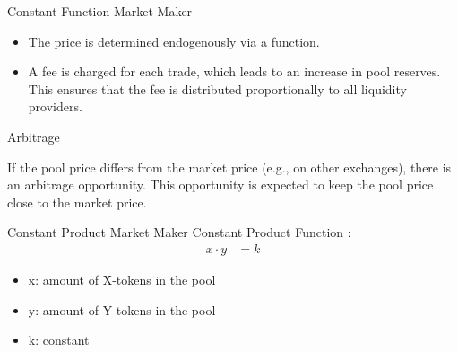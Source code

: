 \documentclass[]{beamer}
\begin{document}
\begin{frame}{Constant Function Market Maker}

	\begin{figure}	
		\centering
		
	\end{figure}

	\begin{itemize}
		\item<5-> The price is determined endogenously via a function.
		\item<6-> A fee is charged for each trade, which leads to an increase in pool reserves. This ensures that the fee is distributed proportionally to all liquidity providers.
	\end{itemize}


\end{frame}


\begin{frame}{Arbitrage}
	\begin{figure}
		
	\end{figure}
		
		If the pool price differs from the market price (e.g., on other exchanges), there is an arbitrage opportunity. This opportunity is expected to keep the pool price close to the market price.
\end{frame}


\begin{frame}{Constant Product Market Maker}
Constant Product Function \cite{UNIV2}:
	\begin{align*}
		x \cdot y &= k
	\end{align*}

	\begin{itemize}
		\item[] x: amount of X-tokens in the pool
		\item[] y: amount of Y-tokens in the pool
		\item[] k: constant
	\end{itemize}
	\vspace{1cm}
\end{frame}
\end{document}
